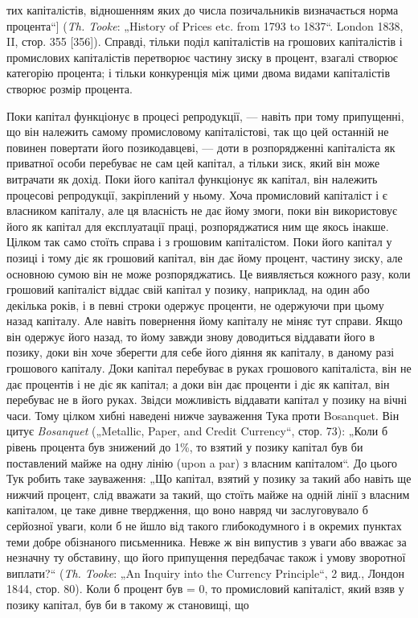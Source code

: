 \parcont{}  %
тих капіталістів, відношенням яких до числа позичальників визначається
норма процента“] (\emph{Th. Tooke}: „History of Prices etc.
from 1793 to 1837“. London 1838, II, стор. 355 [356]). Справді, тільки
поділ капіталістів на грошових капіталістів і промислових капіталістів
перетворює частину зиску в процент, взагалі створює
категорію процента; і тільки конкуренція між цими двома видами
капіталістів створює розмір процента.

Поки капітал функціонує в процесі репродукції, — навіть при
тому припущенні, що він належить самому промисловому капіталістові,
так що цей останній не повинен повертати його позикодавцеві,
— доти в розпорядженні капіталіста як приватної
особи перебуває не сам цей капітал, а тільки зиск, який він
може витрачати як дохід. Поки його капітал функціонує як
капітал, він належить процесові репродукції, закріплений у ньому.
Хоча промисловий капіталіст і є власником капіталу, але ця власність
не дає йому змоги, поки він використовує його як капітал
для експлуатації праці, розпоряджатися ним ще якось інакше.
Цілком так само стоїть справа і з грошовим капіталістом. Поки
його капітал у позиці і тому діє як грошовий капітал, він
дає йому процент, частину зиску, але основною сумою він не
може розпоряджатись. Це виявляється кожного разу, коли грошовий
капіталіст віддає свій капітал у позику, наприклад, на
один або декілька років, і в певні строки одержує проценти,
не одержуючи при цьому назад капіталу. Але навіть повернення
йому капіталу не міняє тут справи. Якщо він одержує
його назад, то йому завжди знову доводиться віддавати його
в позику, доки він хоче зберегти для себе його діяння як
капіталу, в даному разі грошового капіталу. Доки капітал
перебуває в руках грошового капіталіста, він не дає процентів
і не діє як капітал; а доки він дає проценти і діє як капітал,
він перебуває не в його руках. Звідси можливість
віддавати капітал у позику на вічні часи. Тому цілком хибні
наведені нижче зауваження Тука проти Bosanquet. Він цитує
\emph{Bosanquet} („Metallic, Paper, and Credit Currency“, стор. 73):
„Коли б рівень процента був знижений до 1\%, то взятий
у позику капітал був би поставлений майже на одну лінію (upon
a par) з власним капіталом“. До цього Тук робить таке зауваження:
„Що капітал, взятий у позику за такий або навіть ще
нижчий процент, слід вважати за такий, що стоїть майже на
одній лінії з власним капіталом, це таке дивне твердження, що
воно навряд чи заслуговувало б серйозної уваги, коли б не
йшло від такого глибокодумного і в окремих пунктах теми
добре обізнаного письменника. Невже ж він випустив з уваги
або вважає за незначну ту обставину, що його припущення
передбачає також і умову зворотної виплати?“ (\emph{Th. Tooke}: „An
Inquiry into the Currency Principle“, 2 вид., Лондон 1844,
стор. 80). Коли б процент був = 0, то промисловий капіталіст,
який взяв у позику капітал, був би в такому ж становищі, що
\parbreak{}  %
